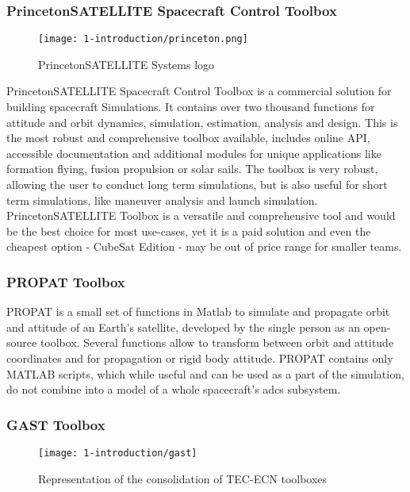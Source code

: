     \subsubsection{PrincetonSATELLITE Spacecraft Control Toolbox}
        \begin{figure}[H]
            \centering
            \texttt{[image: 1-introduction/princeton.png]}
            \caption{PrincetonSATELLITE Systems logo\cite{princetonlogo}}
            \label{fig:princeton}
        \end{figure}
        PrincetonSATELLITE Spacecraft Control Toolbox is a commercial solution for building spacecraft Simulations. It contains over two thousand functions for attitude and orbit dynamics, simulation, estimation, analysis and design. This is the most robust and comprehensive toolbox available, includes online API, accessible documentation and additional modules for unique applications like formation flying, fusion propulsion or solar sails. The toolbox is very robust, allowing the user to conduct long term simulations, but is also useful for short term simulations, like maneuver analysis and launch simulation. PrincetonSATELLITE Toolbox is a versatile and comprehensive tool and would be the best choice for most use-cases, yet it is a paid solution and even the cheapest option - CubeSat Edition - may be out of price range for smaller teams\cite{princeton}.

    \subsubsection{PROPAT Toolbox}
        PROPAT is a small set of functions in Matlab to simulate and propagate orbit and attitude of an Earth's satellite, developed by the single person as an open-source toolbox. Several functions allow to transform between orbit and attitude coordinates and for propagation or rigid body attitude. PROPAT contains only MATLAB scripts, which while useful and can be used as a part of the simulation, do not combine into a model of a whole spacecraft's \ac{adcs} subsystem\cite{propat}.

    \subsubsection{GAST Toolbox}
        \begin{figure}[]
            \centering
            \texttt{[image: 1-introduction/gast]}
            \caption{Representation of the consolidation of TEC-ECN toolboxes}
            \label{fig:gast}
        \end{figure}

